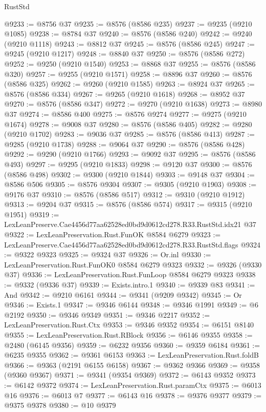 \begin{lexlean}{RustStd}
\begin{coremodule}
@9233 := @8756 @37
@9235 := @8576 (@8586 @235)
@9237 := @9235 (@9210 @1085)
@9238 := @8784 @37
@9240 := @8576 (@8586 @240)
@9242 := @9240 (@9210 @1118)
@9243 := @8812 @37
@9245 := @8576 (@8586 @245)
@9247 := @9245 (@9210 @1217)
@9248 := @8840 @37
@9250 := @8576 (@8586 @272)
@9252 := @9250 (@9210 @1540)
@9253 := @8868 @37
@9255 := @8576 (@8586 @320)
@9257 := @9255 (@9210 @1571)
@9258 := @8896 @37
@9260 := @8576 (@8586 @325)
@9262 := @9260 (@9210 @1585)
@9263 := @8924 @37
@9265 := @8576 (@8586 @334)
@9267 := @9265 (@9210 @1618)
@9268 := @8952 @37
@9270 := @8576 (@8586 @347)
@9272 := @9270 (@9210 @1638)
@9273 := @8980 @37
@9274 := @8586 @400
@9275 := @8576 @9274
@9277 := @9275 (@9210 @1674)
@9278 := @9008 @37
@9280 := @8576 (@8586 @405)
@9282 := @9280 (@9210 @1702)
@9283 := @9036 @37
@9285 := @8576 (@8586 @413)
@9287 := @9285 (@9210 @1738)
@9288 := @9064 @37
@9290 := @8576 (@8586 @428)
@9292 := @9290 (@9210 @1766)
@9293 := @9092 @37
@9295 := @8576 (@8586 @493)
@9297 := @9295 (@9210 @1833)
@9298 := @9120 @37
@9300 := @8576 (@8586 @498)
@9302 := @9300 (@9210 @1844)
@9303 := @9148 @37
@9304 := @8586 @506
@9305 := @8576 @9304
@9307 := @9305 (@9210 @1903)
@9308 := @9176 @37
@9310 := @8576 (@8586 @517)
@9312 := @9310 (@9210 @1912)
@9313 := @9204 @37
@9315 := @8576 (@8586 @574)
@9317 := @9315 (@9210 @1951)
@9319 := LexLeanPreserve.Cae4456d77aa62528ed0bd9d0612cd278.R33.RustStd.idx21 @37
@9322 := LexLeanPreservation.Rust.FunOK @8584 @6279
@9323 := LexLeanPreserve.Cae4456d77aa62528ed0bd9d0612cd278.R33.RustStd.flags
@9324 := @9322 @9323
@9325 := @9324 @37
@9326 := Or.inl
@9330 := LexLeanPreservation.Rust.FunOK0 @8584 @6279 @9323
@9332 := @9326 (@9330 @37)
@9336 := LexLeanPreservation.Rust.FunLoop @8584 @6279 @9323
@9338 := @9332 (@9336 @37)
@9339 := Exists.intro.{1}
@9340 := @9339 @83
@9341 := And
@9342 := @9210 @6161
@9344 := @9341 (@9209 @9342)
@9345 := Or
@9346 := Exists.{1}
@9347 := @9346 @6144
@9348 := @9346 @1991
@9349 := @6 @2192
@9350 := @9346 @9349
@9351 := @9346 @2217
@9352 := LexLeanPreservation.Rust.Ctx
@9353 := @9346 @9352
@9354 := @6151 @8140
@9355 := LexLeanPreservation.Rust.RBlock
@9356 := @6146 @9355
@9358 := @2480 (@6145 @9356)
@9359 := @6232 @9356
@9360 := @9359 @6184
@9361 := @6235 @9355
@9362 := @9361 @6153
@9363 := LexLeanPreservation.Rust.foldB
@9366 := @9363 (@2191 @6155 @6158)
@9367 := @9362 @9366
@9369 := @9358 (@9360 @9367)
@9371 := @9341 (@9354 @9369)
@9372 := @6143 @9352
@9373 := @6142 @9372
@9374 := LexLeanPreservation.Rust.paramCtx
@9375 := @6013 @16
@9376 := @6013 @7
@9377 := @6143 @16
@9378 := @9376 @9377
@9379 := @9375 @9378
@9380 := @10 @9379

\end{coremodule}
\end{lexlean}
